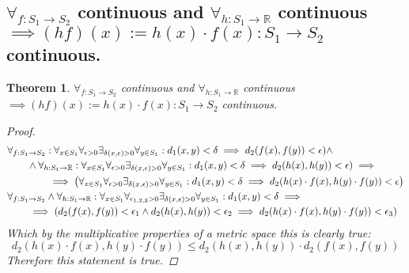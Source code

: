 \documentclass[]{article}
\newcommand{\R}{\mathbb{R}}
\newtheorem{theorem}{Theorem}
\begin{document}
\subsection{$\forall_{f : S_1 \to S_2}$ continuous and $\forall_{h : S_1 \to \R}$ continuous $\implies (h f) (x) := h(x) \cdot f(x) : S_1 \to S_2$ continuous.}
\begin{theorem}
    $\forall_{f : S_1 \to S_2}$ continuous and $\forall_{h : S_1 \to \R}$ continuous $\implies (h f) (x) := h(x) \cdot f(x) : S_1 \to S_2$ continuous.
    \begin{proof}
        \begin{align*}
            &\forall_{f : S_1 \to S_2} : \forall_{x\in S_1} \forall_{\epsilon>0} \exists_{\delta(x,\epsilon)>0} \forall_{y\in S_1} : d_1(x,y) < \delta \implies d_2(f(x),f(y)) < \epsilon) \land\\
                &\qquad\land \forall_{h : S_1 \to \R} : \forall_{x\in S_1} \forall_{\epsilon>0} \exists_{\delta(x,\epsilon)>0} \forall_{y\in S_1} : d_1(x,y) < \delta \implies d_2(h(x),h(y)) < \epsilon) \implies\\
                &\qquad \qquad \implies \qty(\forall_{x\in S_1} \forall_{\epsilon>0} \exists_{\delta(x,\epsilon)>0} \forall_{y\in S_1} : d_1(x,y) < \delta \implies d_2(h(x) \cdot f(x),h(y) \cdot f(y)) < \epsilon)\\
            &\forall_{f : S_1 \to S_2} \land \forall_{h : S_1 \to \R} : \forall_{x\in S_1} \forall_{\epsilon_{1,2,3}>0} \exists_{\delta(x,\epsilon)>0} \forall_{y\in S_1} : d_1(x,y) < \delta \implies\\
                &\qquad \implies \qty(d_2(f(x),f(y))< \epsilon_1 \land d_2(h(x),h(y)) < \epsilon_2 \implies d_2(h(x) \cdot f(x), h(y) \cdot f(y)) < \epsilon_3)
        \end{align*}
        Which by the multiplicative properties of a metric space this is clearly true:
        $$d_2(h(x) \cdot f(x), h(y) \cdot f(y)) \leq d_2(h(x),h(y)) \cdot d_2(f(x),f(y))$$
        Therefore this statement is true.
    \end{proof}
\end{theorem}

\newpage
\end{document}
